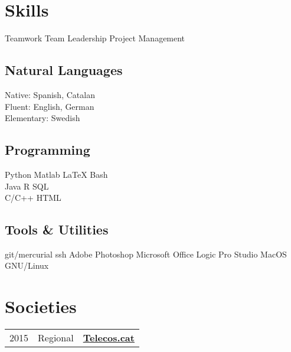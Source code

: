 \documentclass[]{deedy-resume}
\begin{document}
\begin{minipage}[t]{0.43\textwidth}

\section{Skills}
Teamwork \textbullet{} Team Leadership \textbullet{} Project Management\\

\subsection{Natural Languages}
Native: Spanish, Catalan \\
Fluent: English, German \\
Elementary: Swedish\\

\subsection{Programming}
Python \textbullet{} Matlab \textbullet{} \LaTeX \textbullet{} Bash  \\
Java \textbullet{} R \textbullet{} SQL \\
C/C++ \textbullet{} HTML  \\


\subsection{Tools \& Utilities}
git/mercurial \textbullet{} ssh \textbullet{} Adobe Photoshop \textbullet{} Microsoft Office \textbullet{} Logic Pro
Studio \textbullet{} MacOS \textbullet{} GNU/Linux \\

\sectionsep


\section{Societies}
\begin{tabular}{rll}
2015         & Regional  & \textbf{\href{www.telecos.cat}{Telecos.cat}}\\
\end{tabular}
\sectionsep



\end{minipage}
\end{document}
